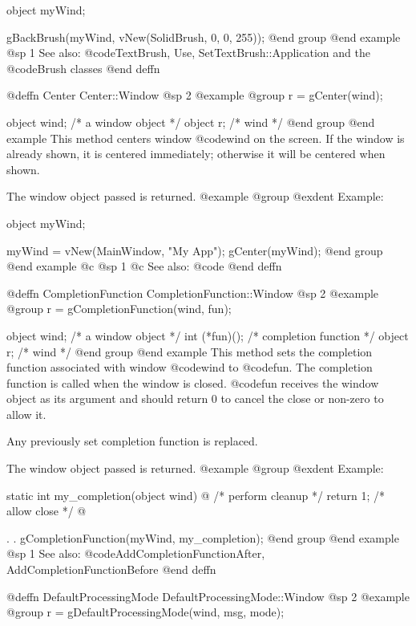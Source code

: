 object  myWind;

gBackBrush(myWind, vNew(SolidBrush, 0, 0, 255));
@end group
@end example
@sp 1
See also:  @code{TextBrush, Use, SetTextBrush::Application}
        and the @code{Brush} classes
@end deffn












@deffn {Center} Center::Window
@sp 2
@example
@group
r = gCenter(wind);

object  wind;   /*  a window object  */
object  r;      /*  wind             */
@end group
@end example
This method centers window @code{wind} on the screen.  If the
window is already shown, it is centered immediately; otherwise
it will be centered when shown.

The window object passed is returned.
@example
@group
@exdent Example:

object  myWind;

myWind = vNew(MainWindow, "My App");
gCenter(myWind);
@end group
@end example
@c @sp 1
@c See also:  @code{}
@end deffn




@deffn {CompletionFunction} CompletionFunction::Window
@sp 2
@example
@group
r = gCompletionFunction(wind, fun);

object  wind;      /*  a window object     */
int    (*fun)();   /*  completion function  */
object  r;         /*  wind                */
@end group
@end example
This method sets the completion function associated with window
@code{wind} to @code{fun}.  The completion function is called
when the window is closed.  @code{fun} receives the window
object as its argument and should return 0 to cancel the
close or non-zero to allow it.

Any previously set completion function is replaced.

The window object passed is returned.
@example
@group
@exdent Example:

static  int  my_completion(object wind)
@{
        /* perform cleanup */
        return 1;  /* allow close */
@}

        .
        .
        gCompletionFunction(myWind, my_completion);
@end group
@end example
@sp 1
See also:  @code{AddCompletionFunctionAfter, AddCompletionFunctionBefore}
@end deffn




@deffn {DefaultProcessingMode} DefaultProcessingMode::Window
@sp 2
@example
@group
r = gDefaultProcessingMode(wind, msg, mode);

